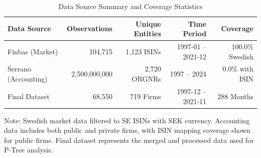 
\begin{table}[htbp]
\centering
\caption{Data Source Summary and Coverage Statistics}
\label{tab:data_source_summary}
\begin{tabular}{lrrrr}
\toprule
\textbf{Data Source} & \textbf{Observations} & \textbf{Unique Entities} & \textbf{Time Period} & \textbf{Coverage} \\
\midrule
Finbas (Market) & 104,715 & 1,123 ISINs & 1997-01 -- 2021-12 & 100.0\% Swedish \\
Serrano (Accounting) & 2,500,000,000 & 2,720 ORGNRs & 1997 -- 2024 & 0.0\% with ISIN \\
Final Dataset & 68,550 & 719 Firms & 1997-12 -- 2021-11 & 288 Months \\
\bottomrule
\end{tabular}
\begin{tablenotes}
\small
\item Note: Swedish market data filtered to SE ISINs with SEK currency. 
Accounting data includes both public and private firms, with ISIN mapping coverage shown for public firms.
Final dataset represents the merged and processed data used for P-Tree analysis.
\end{tablenotes}
\end{table}
